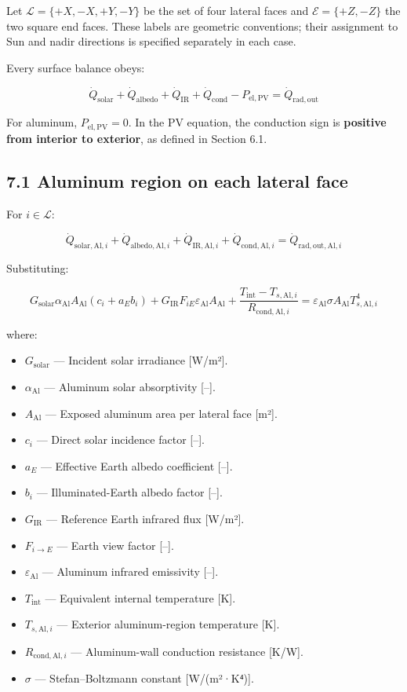 \documentclass[
]{book}
\providecommand{\tightlist}{%
  \setlength{\itemsep}{0pt}\setlength{\parskip}{0pt}}
\begin{document}
Let \(\mathcal L=\{+X,-X,+Y,-Y\}\) be the set of four lateral faces and \(\mathcal E=\{+Z,-Z\}\) the two square end faces. These labels are geometric conventions; their assignment to Sun and nadir directions is specified separately in each case.

Every surface balance obeys:

\[
\boxed{
\dot Q_{\mathrm{solar}}
+\dot Q_{\mathrm{albedo}}
+\dot Q_{\mathrm{IR}}
+\dot Q_{\mathrm{cond}}
-P_{\mathrm{el,PV}}
=\dot Q_{\mathrm{rad,out}}
}
\]

For aluminum, \(P_{\mathrm{el,PV}}=0\). In the PV equation, the conduction sign is \textbf{positive from interior to exterior}, as defined in Section 6.1.

\subsection{7.1 Aluminum region on each lateral face}\label{aluminum-region-on-each-lateral-face}

For \(i\in\mathcal L\):

\[
\boxed{
\dot Q_{\mathrm{solar,Al},i}
+\dot Q_{\mathrm{albedo,Al},i}
+\dot Q_{\mathrm{IR,Al},i}
+\dot Q_{\mathrm{cond,Al},i}
=\dot Q_{\mathrm{rad,out,Al},i}
}
\]

Substituting:

\[
G_{\mathrm{solar}}\alpha_{\mathrm{Al}}A_{\mathrm{Al}}(c_i+a_Eb_i)
+
G_{\mathrm{IR}}F_{iE}\varepsilon_{\mathrm{Al}}A_{\mathrm{Al}}
+
\frac{T_{\mathrm{int}}-T_{s,\mathrm{Al},i}}{R_{\mathrm{cond,Al},i}}
=
\varepsilon_{\mathrm{Al}}\sigma A_{\mathrm{Al}}T_{s,\mathrm{Al},i}^{4}
\]

where:

\begin{itemize}
\tightlist
\item
  \(G_{\mathrm{solar}}\) --- Incident solar irradiance {[}W/m²{]}.
\item
  \(\alpha_{\mathrm{Al}}\) --- Aluminum solar absorptivity {[}--{]}.
\item
  \(A_{\mathrm{Al}}\) --- Exposed aluminum area per lateral face {[}m²{]}.
\item
  \(c_i\) --- Direct solar incidence factor {[}--{]}.
\item
  \(a_E\) --- Effective Earth albedo coefficient {[}--{]}.
\item
  \(b_i\) --- Illuminated-Earth albedo factor {[}--{]}.
\item
  \(G_{\mathrm{IR}}\) --- Reference Earth infrared flux {[}W/m²{]}.
\item
  \(F_{i\to E}\) --- Earth view factor {[}--{]}.
\item
  \(\varepsilon_{\mathrm{Al}}\) --- Aluminum infrared emissivity {[}--{]}.
\item
  \(T_{\mathrm{int}}\) --- Equivalent internal temperature {[}K{]}.
\item
  \(T_{s,\mathrm{Al},i}\) --- Exterior aluminum-region temperature {[}K{]}.
\item
  \(R_{\mathrm{cond,Al},i}\) --- Aluminum-wall conduction resistance {[}K/W{]}.
\item
  \(\sigma\) --- Stefan--Boltzmann constant {[}W/(m²·K⁴){]}.
\end{itemize}
\end{document}
